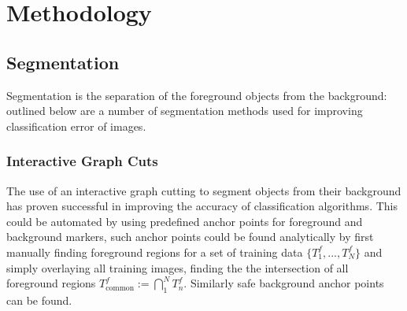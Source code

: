 \documentclass[11pt, titlepage, oneside]{article}
\theoremstyle{plain}
\theoremstyle{definition}
\theoremstyle{remark}
\begin{document}
\section{Methodology}
	\subsection{Segmentation}
		Segmentation is the separation of the foreground objects from the background: outlined below are a number of segmentation methods used for improving classification error of images.
		
		\subsubsection{Interactive Graph Cuts}
			The use of an interactive graph cutting\cite{ND} to segment objects from their background has proven successful in improving the accuracy of classification algorithms\cite{vocab}. This could be automated by using predefined anchor points for foreground and background markers, such anchor points could be found analytically by first manually finding foreground regions for a set of training data $\{T^{f}_1,...,T^{f}_N\}$ and simply overlaying all training images, finding the the intersection of all foreground regions $T^{f}_{\text{common}} := \bigcap_{1}^{N}T^{f}_n$. Similarly safe background anchor points can be found.
	
\end{document}
